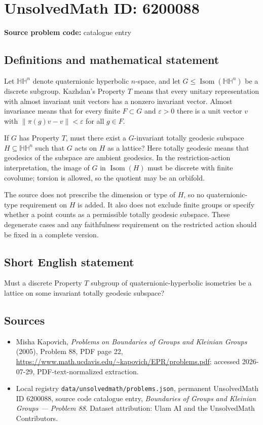 \documentclass[11pt]{article}
\begin{document}
\section*{UnsolvedMath ID: 6200088}
\textbf{Source problem code:} catalogue entry
\subsection{Definitions and mathematical statement}
Let $\mathbb H\mathbb H^n$ denote quaternionic hyperbolic $n$-space, and let $G\leq\operatorname{Isom}(\mathbb H\mathbb H^n)$ be a discrete subgroup. Kazhdan's Property $T$ means that every unitary representation with almost invariant unit vectors has a nonzero invariant vector. Almost invariance means that for every finite $F\subset G$ and $\varepsilon>0$ there is a unit vector $v$ with $\|\pi(g)v-v\|<\varepsilon$ for all $g\in F$.

If $G$ has Property $T$, must there exist a $G$-invariant totally geodesic subspace $H\subseteq\mathbb H\mathbb H^n$ such that $G$ acts on $H$ as a lattice? Here totally geodesic means that geodesics of the subspace are ambient geodesics. In the restriction-action interpretation, the image of $G$ in $\operatorname{Isom}(H)$ must be discrete with finite covolume; torsion is allowed, so the quotient may be an orbifold.

The source does not prescribe the dimension or type of $H$, so no quaternionic-type requirement on $H$ is added. It also does not exclude finite groups or specify whether a point counts as a permissible totally geodesic subspace. These degenerate cases and any faithfulness requirement on the restricted action should be fixed in a complete version.
\subsection{Short English statement}
Must a discrete Property $T$ subgroup of quaternionic-hyperbolic isometries be a lattice on some invariant totally geodesic subspace?
\subsection{Sources}
\begin{itemize}
\item Misha Kapovich, \emph{Problems on Boundaries of Groups and Kleinian Groups} (2005), Problem 88, PDF page 22, \url{https://www.math.ucdavis.edu/~kapovich/EPR/problems.pdf}; accessed 2026-07-29, PDF-text-normalized extraction.
\item Local registry \texttt{data/unsolvedmath/problems.json}, permanent UnsolvedMath ID $6200088$, source code catalogue entry, \emph{Boundaries of Groups and Kleinian Groups --- Problem 88}. Dataset attribution: Ulam AI and the UnsolvedMath Contributors.
\end{itemize}
\end{document}
